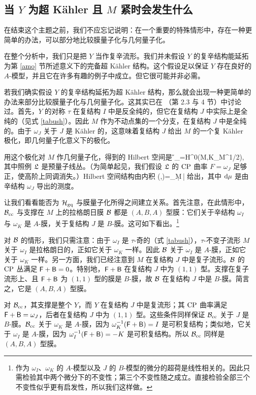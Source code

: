 \subsection{当 $Y$ 为超 Kähler 且 $M$ 紧时会发生什么}\label{hyperm}

在结束这个主题之前，我们不应忘记说明：在一个重要的特殊情形中，存在一种更简单的办法，可以部分地比较膜量子化与几何量子化。

在整个分析中，我们只是把 $Y$ 当作复辛流形。我们并未假设 $Y$ 的复辛结构能延拓为第 \ref{amo} 节所述意义下的完备超 Kähler 结构。这个假设足以保证 $Y$ 存在良好的 $A$-模型，并且它在许多有趣的例子中成立。但它很可能并非必需。

若我们确实假设 $Y$ 的复辛结构延拓为超 Kähler 结构，那么就会出现一种更简单的办法来部分比较膜量子化与几何量子化。这其实已在 \cite{GW}（第 2.3 与 4 节）中讨论过。首先，$Y$ 的对称 $\tau$ 在复结构 $I$ 中是反全纯的，但它在复结构 $J$ 中实际上是全纯的（见式 \eqref{tabush}）。因此 $M$ 作为不动点集的一个分支，在复结构 $J$ 中是全纯的。由于 $\omega_J$ 关于 $J$ 是 Kähler 的，这意味着复结构 $J$ 给出 $M$ 的一个复 Kähler 极化，即几何量子化意义下的极化。

用这个极化对 $M$ 作几何量子化，得到的 Hilbert 空间是
\be\label{hgq}\H_\gq=H^0(M,K_M^{1/2}\otimes\frL),\ee
其中照例 ${\mathfrak L}$ 是预量子线丛。（为简单起见，我们假设 ${\mathfrak L}$ 的 ${\mathrm{CP}}$ 曲率 $F=\omega_J$ 足够正，使高阶上同调消失。）Hilbert 空间结构由内积
\be\label{ngg}(\psi,\chi)=\int_M\d\mu\,\bar\psi\chi\ee
给出，其中 ${\mathrm d}\mu$ 是由辛结构 $\omega_J$ 导出的测度。

让我们看看能否为 ${\mathcal H}_{\mathrm{gq}}$ 与膜量子化所得之间建立关系。首先注意，在此情形中，${\mathcal B}_{\mathrm{cc}}$ 与支撑在 $M$ 上的拉格朗日膜 ${\mathcal B}$ 都是 $(A,B,A)$ 型膜：它们关于辛结构 $\omega_I$ 与 $\omega_K$ 是 $A$-膜，关于复结构 $J$ 是 $B$-膜。这可如下看出。\footnote{作为 $\omega_I$、$\omega_K$ 的 $A$-模型以及 $J$ 的 $B$-模型的微分的超荷是线性相关的。因此只需检验其中两个微分下的不变性；第三个不变性随之成立。直接检验全部三个不变性似乎更有启发性，所以我们这样做。}

对 ${\mathcal B}$ 的情形，我们只需注意：由于 $\omega_I$ 是 $\tau$-奇的（式 \eqref{tabush}），$\tau$-不变子流形 $M$ 关于 $\omega_I$ 是拉格朗日的，正如它关于 $\omega_K$ 一样。因此 ${\mathcal B}$ 关于 $\omega_I$ 是 $A$-膜，正如它关于 $\omega_K$ 一样。另一方面，我们已经注意到 $M$ 在复结构 $J$ 中是复子流形。${\mathcal B}$ 的 ${\mathrm{CP}}$ 丛满足 ${\sf F}+{\sf B}=0$。特别地，${\sf F}+{\sf B}$ 在复结构 $J$ 中为 $(1,1)$ 型。支撑在复子流形上、且 ${\sf F}+{\sf B}$ 为 $(1,1)$ 型的膜是 $B$-膜，故 ${\mathcal B}$ 在复结构 $J$ 中是 $B$-膜。简言之，它是 $(A,B,A)$ 型膜。

对 ${\mathcal B}_{\mathrm{cc}}$，其支撑是整个 $Y$，而 $Y$ 在复结构 $J$ 中是复流形；其 ${\mathrm{CP}}$ 曲率满足 ${\sf F}+{\sf B}=\omega_J$，后者在复结构 $J$ 中为 $(1,1)$ 型。这些条件同样保证 ${\mathcal B}_{\mathrm{cc}}$ 关于 $J$ 是 $B$-膜。${\mathcal B}_{\mathrm{cc}}$ 关于 $\omega_K$ 是 $A$-膜，因为 $\omega_K^{-1}({\sf F}+{\sf B})=I$ 是可积复结构；类似地，它关于 $\omega_I$ 是 $A$-膜，因为 $\omega_I^{-1}({\sf F}+{\sf B})=-K$ 是可积复结构。所以 ${\mathcal B}_{\mathrm{cc}}$ 同样是 $(A,B,A)$ 型膜。

